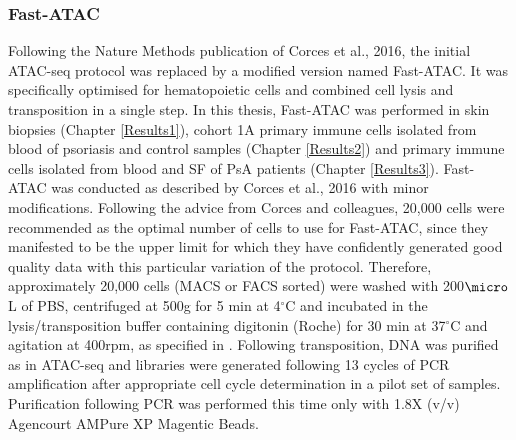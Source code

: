 

\subsubsection{Fast-ATAC}
Following the Nature Methods publication of Corces et al., 2016, the  initial ATAC-seq protocol was replaced by a modified version named Fast-ATAC. It was specifically optimised for hematopoietic cells and combined cell lysis and transposition in a single step. In this thesis, Fast-ATAC was performed in skin biopsies (Chapter \ref{Results1}), cohort 1A primary immune cells isolated from blood of psoriasis and control samples (Chapter \ref{Results2}) and primary immune cells isolated from blood and SF of PsA patients (Chapter \ref{Results3}). Fast-ATAC was conducted as described by Corces et al., 2016 with minor modifications. Following the advice from Corces and colleagues, 20,000 cells were recommended as the optimal number of cells to use for Fast-ATAC, since they manifested to be the upper limit for which they have confidently generated good quality data with this particular variation of the protocol. Therefore, approximately 20,000 cells (MACS or FACS sorted) were washed with 200$\micro$L of PBS, centrifuged at 500g for 5 min at 4$^\circ$C and incubated in the lysis/transposition buffer containing digitonin (Roche) for 30 min at 37{$^\circ$}C and agitation at 400rpm, as specified in \parencite{Corces2016}. Following transposition, DNA was purified as in ATAC-seq and libraries were generated following 13 cycles of PCR amplification after appropriate cell cycle determination in a pilot set of samples. Purification following PCR was performed this time only with 1.8X (v/v) Agencourt AMPure XP Magentic Beads.

